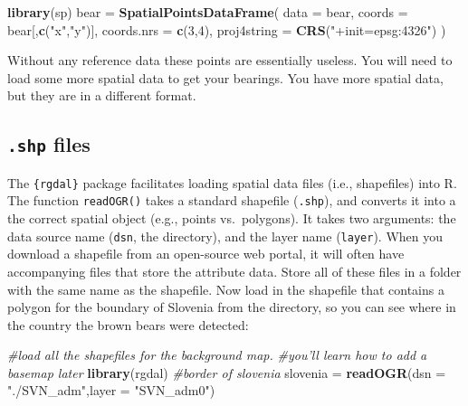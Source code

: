 \documentclass[]{book}
\newenvironment{Shaded}{\begin{snugshade}}{\end{snugshade}}
\newcommand{\KeywordTok}[1]{\textcolor[rgb]{0.13,0.29,0.53}{\textbf{#1}}}
\newcommand{\DataTypeTok}[1]{\textcolor[rgb]{0.13,0.29,0.53}{#1}}
\newcommand{\DecValTok}[1]{\textcolor[rgb]{0.00,0.00,0.81}{#1}}
\newcommand{\StringTok}[1]{\textcolor[rgb]{0.31,0.60,0.02}{#1}}
\newcommand{\CommentTok}[1]{\textcolor[rgb]{0.56,0.35,0.01}{\textit{#1}}}
\newcommand{\NormalTok}[1]{#1}
\theoremstyle{definition}
\theoremstyle{definition}
\theoremstyle{definition}
\theoremstyle{remark}
\begin{document}
\begin{Shaded}
\begin{Highlighting}[]
\KeywordTok{library}\NormalTok{(sp)}
\NormalTok{bear =}\StringTok{ }\KeywordTok{SpatialPointsDataFrame}\NormalTok{(}
  \DataTypeTok{data =}\NormalTok{ bear,}
  \DataTypeTok{coords =}\NormalTok{ bear[,}\KeywordTok{c}\NormalTok{(}\StringTok{"x"}\NormalTok{,}\StringTok{"y"}\NormalTok{)],}
  \DataTypeTok{coords.nrs =} \KeywordTok{c}\NormalTok{(}\DecValTok{3}\NormalTok{,}\DecValTok{4}\NormalTok{),}
  \DataTypeTok{proj4string =} \KeywordTok{CRS}\NormalTok{(}\StringTok{"+init=epsg:4326"}\NormalTok{)}
\NormalTok{  )}
\end{Highlighting}
\end{Shaded}

Without any reference data these points are essentially useless. You
will need to load some more spatial data to get your bearings. You have
more spatial data, but they are in a different format.

\subsection{\texorpdfstring{\texttt{.shp}
files}{.shp files}}\label{shp-files}

The \texttt{\{rgdal\}} package \citep{R-rgdal} facilitates loading
spatial data files (i.e., shapefiles) into R. The function
\texttt{readOGR()} takes a standard shapefile (\texttt{.shp}), and
converts it into a the correct spatial object (e.g., points
vs.~polygons). It takes two arguments: the data source name
(\texttt{dsn}, the directory), and the layer name (\texttt{layer}). When
you download a shapefile from an open-source web portal, it will often
have accompanying files that store the attribute data. Store all of
these files in a folder with the same name as the shapefile. Now load in
the shapefile that contains a polygon for the boundary of Slovenia
\citep{svn-cite} from the directory, so you can see where in the country
the brown bears were detected:

\begin{Shaded}
\begin{Highlighting}[]
\CommentTok{#load all the shapefiles for the background map. }
\CommentTok{#you'll learn how to add a basemap later}
\KeywordTok{library}\NormalTok{(rgdal)}
\CommentTok{#border of slovenia}
\NormalTok{slovenia =}\StringTok{ }\KeywordTok{readOGR}\NormalTok{(}\DataTypeTok{dsn =} \StringTok{"./SVN_adm"}\NormalTok{,}\DataTypeTok{layer =} \StringTok{"SVN_adm0"}\NormalTok{)}
\end{Highlighting}
\end{Shaded}
\end{document}
